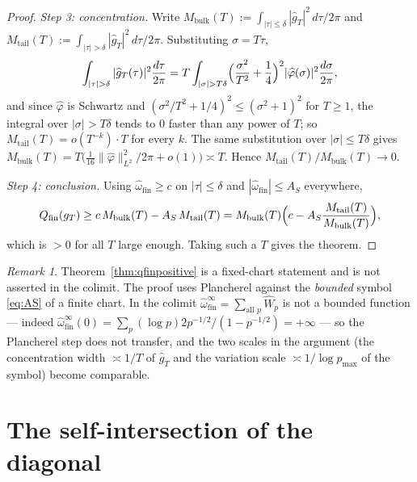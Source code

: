 \documentclass[11pt]{amsart}
\theoremstyle{definition}
\theoremstyle{remark}
\newtheorem{remark}[theorem]{Remark}
\begin{document}
\begin{proof}
\emph{Step 3: concentration.} Write
$M_{\mathrm{bulk}}(T):=\int_{|\tau|\le\delta}|\widehat g_T|^2\,d\tau/2\pi$ and
$M_{\mathrm{tail}}(T):=\int_{|\tau|>\delta}|\widehat g_T|^2\,d\tau/2\pi$.
Substituting $\sigma=T\tau$,
\[
  \int_{|\tau|>\delta}|\widehat g_T(\tau)|^2\frac{d\tau}{2\pi}
   =T\int_{|\sigma|>T\delta}\Bigl(\frac{\sigma^2}{T^2}+\frac14\Bigr)^2
     |\widehat\varphi(\sigma)|^2\frac{d\sigma}{2\pi},
\]
and since $\widehat\varphi$ is Schwartz and
$(\sigma^2/T^2+1/4)^2\le(\sigma^2+1)^2$ for $T\ge1$, the integral over
$|\sigma|>T\delta$ tends to $0$ faster than any power of $T$; so
$M_{\mathrm{tail}}(T)=o(T^{-k})\cdot T$ for every $k$. The same substitution
over $|\sigma|\le T\delta$ gives
$M_{\mathrm{bulk}}(T)=T\bigl(\tfrac1{16}\|\widehat\varphi\|_{L^2}^2/2\pi
+o(1)\bigr)\asymp T$. Hence
$M_{\mathrm{tail}}(T)/M_{\mathrm{bulk}}(T)\to0$.

\emph{Step 4: conclusion.} Using $\widehat\omega_{\mathrm{fin}}\ge c$ on
$|\tau|\le\delta$ and $|\widehat\omega_{\mathrm{fin}}|\le A_S$ everywhere,
\[
  Q_{\mathrm{fin}}(g_T)\ge c\,M_{\mathrm{bulk}}(T)-A_S\,M_{\mathrm{tail}}(T)
   =M_{\mathrm{bulk}}(T)\Bigl(c-A_S\frac{M_{\mathrm{tail}}(T)}
     {M_{\mathrm{bulk}}(T)}\Bigr),
\]
which is $>0$ for all $T$ large enough. Taking such a $T$ gives the theorem.
\end{proof}

\begin{remark}\label{rem:qfinscope}
Theorem~\ref{thm:qfinpositive} is a fixed-chart statement and is not asserted
in the colimit. The proof uses Plancherel against the \emph{bounded} symbol
\eqref{eq:AS} of a finite chart. In the colimit
$\widehat\omega_{\mathrm{fin}}^\infty=\sum_{\text{all }p}\widehat W_p$ is not a
bounded function --- indeed
$\widehat\omega_{\mathrm{fin}}^\infty(0)=\sum_p(\log p)2p^{-1/2}/(1-p^{-1/2})
=+\infty$ --- so the Plancherel step does not transfer, and the two scales in
the argument (the concentration width $\asymp1/T$ of $\widehat g_T$ and the
variation scale $\asymp1/\log p_{\max}$ of the symbol) become comparable.
\end{remark}

\section{The self-intersection of the diagonal}\label{sec:diagonal}
\end{document}
